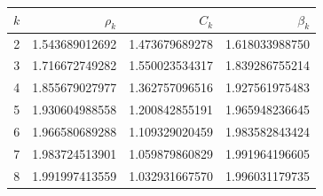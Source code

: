 \begin{center}
\begin{tabular}{@{}rrrr@{}}
\toprule
$k$ & $\rho_k$ & $C_k$ & $\beta_k$\\
\midrule
2 & 1.543689012692 & 1.473679689278 & 1.618033988750\\
3 & 1.716672749282 & 1.550023534317 & 1.839286755214\\
4 & 1.855679027977 & 1.362757096516 & 1.927561975483\\
5 & 1.930604988558 & 1.200842855191 & 1.965948236645\\
6 & 1.966580689288 & 1.109329020459 & 1.983582843424\\
7 & 1.983724513901 & 1.059879860829 & 1.991964196605\\
8 & 1.991997413559 & 1.032931667570 & 1.996031179735\\
\bottomrule
\end{tabular}
\end{center}
